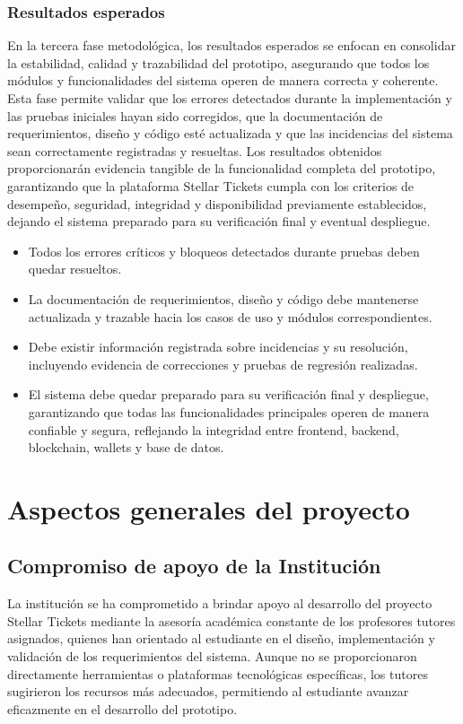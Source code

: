 \documentclass[12pt,a4paper]{article}
\begin{document}
\subsubsection{Resultados esperados}
En la tercera fase metodológica, los resultados esperados se enfocan en consolidar la estabilidad, calidad y trazabilidad del prototipo, asegurando que todos los módulos y funcionalidades del sistema operen de manera correcta y coherente. Esta fase permite validar que los errores detectados durante la implementación y las pruebas iniciales hayan sido corregidos, que la documentación de requerimientos, diseño y código esté actualizada y que las incidencias del sistema sean correctamente registradas y resueltas. Los resultados obtenidos proporcionarán evidencia tangible de la funcionalidad completa del prototipo, garantizando que la plataforma Stellar Tickets cumpla con los criterios de desempeño, seguridad, integridad y disponibilidad previamente establecidos, dejando el sistema preparado para su verificación final y eventual despliegue.
\begin{itemize}
    \item Todos los errores críticos y bloqueos detectados durante pruebas
    deben quedar resueltos.

    \item La documentación de requerimientos, diseño y código debe mantenerse
    actualizada y trazable hacia los casos de uso y módulos correspondientes.

    \item Debe existir información registrada sobre incidencias y su resolución,
    incluyendo evidencia de correcciones y pruebas de regresión realizadas.

    \item El sistema debe quedar preparado para su verificación final y despliegue,
    garantizando que todas las funcionalidades principales operen de manera
    confiable y segura, reflejando la integridad entre frontend, backend,
    blockchain, wallets y base de datos.
\end{itemize}

\section{Aspectos generales del proyecto}

\subsection{Compromiso de apoyo de la Institución}
La institución se ha comprometido a brindar apoyo al desarrollo del proyecto Stellar Tickets mediante la asesoría académica constante de los profesores tutores asignados, quienes han orientado al estudiante en el diseño, implementación y validación de los requerimientos del sistema. Aunque no se proporcionaron directamente herramientas o plataformas tecnológicas específicas, los tutores sugirieron los recursos más adecuados, permitiendo al estudiante avanzar eficazmente en el desarrollo del prototipo. 
\end{document}
